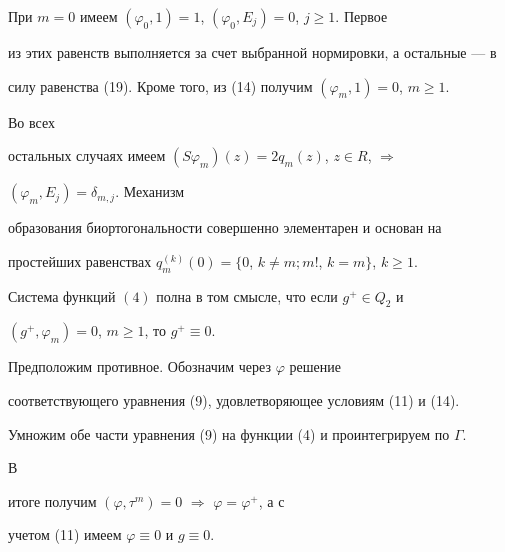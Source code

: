  


 


\begin{pf} 


При $m=0$ имеем $(\varphi_0,1)=1$, $(\varphi_0,E_j)=0$, $j\ge1$. Первое 


из этих равенств выполняется за счет выбранной нормировки, а остальные --- в 


силу равенства (19). Кроме того, из (14) получим $(\varphi_m,1)=0$, $m\ge1$. 


Во всех 


остальных случаях имеем $(S\varphi_m)(z)=2q_m(z)$, $z\in R$, $\Rightarrow$ 


$(\varphi_m,E_j)=\delta_{m,j}$. Механизм 


образования биортогональности совершенно элементарен и основан на 


простейших равенствах $q^{(k)}_m(0)=\{0$, $k\ne m;m!$, $k=m\}$, $k\ge1$. 


\end{pf} 


 


 


\begin{thm} 


Система функций $(4)$ полна в том смысле, что если $g^+\in Q_2$ и 


$(g^+,\varphi_m)=0$, $m\ge1$, то $g^+\equiv0$. 


\end{thm} 


 


 


\begin{pf} 


Предположим противное. Обозначим через $\varphi$ решение 


соответствующего уравнения (9), удовлетворяющее условиям (11) и (14). 


Умножим обе части уравнения (9) на функции (4) и проинтегрируем по $\Gamma$. 


В 


итоге получим $(\varphi,\tau^m)=0$ $\Rightarrow$ $\varphi=\varphi^+$, а с 


учетом (11) имеем $\varphi\equiv0$ и $g\equiv0$. 


\end{pf} 


 


